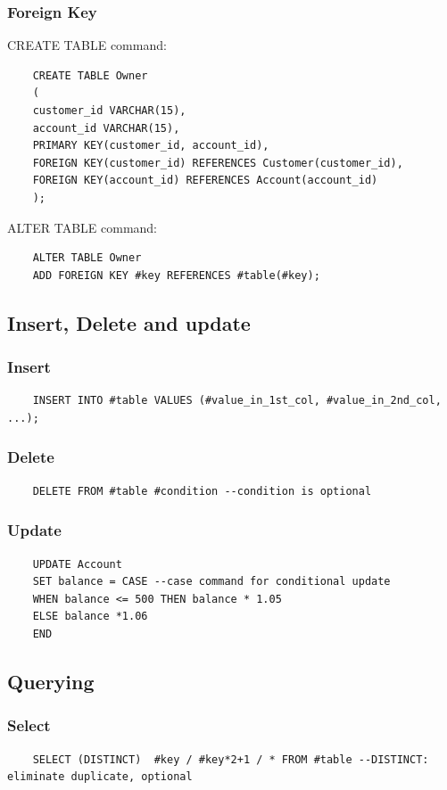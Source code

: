 \documentclass[11pt,a4paper]{article}
\begin{document}
\subsubsection{Foreign Key}
CREATE TABLE command:
\begin{lstlisting}
    CREATE TABLE Owner
    (
    customer_id VARCHAR(15),
    account_id VARCHAR(15),
    PRIMARY KEY(customer_id, account_id),
    FOREIGN KEY(customer_id) REFERENCES Customer(customer_id),
    FOREIGN KEY(account_id) REFERENCES Account(account_id)
    );
\end{lstlisting}

ALTER TABLE command:
\begin{lstlisting}
    ALTER TABLE Owner
    ADD FOREIGN KEY #key REFERENCES #table(#key);
\end{lstlisting}

\subsection{Insert, Delete and update}
\subsubsection{Insert}
\begin{lstlisting}
    INSERT INTO #table VALUES (#value_in_1st_col, #value_in_2nd_col, ...);
\end{lstlisting}

\subsubsection{Delete}
\begin{lstlisting}
    DELETE FROM #table #condition --condition is optional
\end{lstlisting}

\subsubsection{Update}
\begin{lstlisting}
    UPDATE Account
    SET balance = CASE --case command for conditional update
    WHEN balance <= 500 THEN balance * 1.05
    ELSE balance *1.06
    END
\end{lstlisting}

\subsection{Querying}
\subsubsection{Select}
\begin{lstlisting}
    SELECT (DISTINCT)  #key / #key*2+1 / * FROM #table --DISTINCT: eliminate duplicate, optional
\end{lstlisting}
\end{document}
